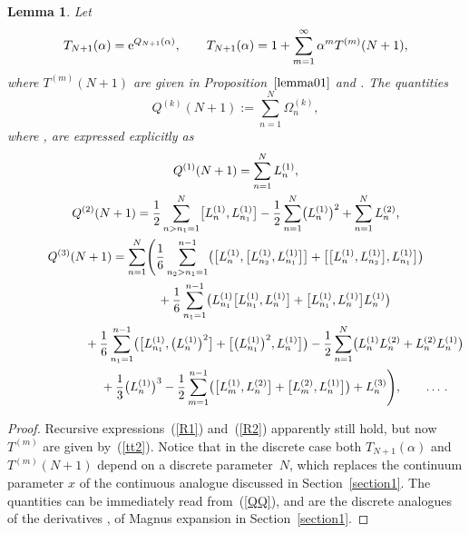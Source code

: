 \documentclass[10pt,a4paper]{amsart}
\numberwithin{equation}{section}
\newtheorem{lem}[thm]{Lemma}
\theoremstyle{definition}
\def\mathcal#1{#1}%
\begin{document}
\begin{lem}\label{lemma2} Let
\[
T_{N+1}(\alpha) = {\rm e}^{{\mathcal Q}_{N+1}(\alpha)}, \qquad T_{N+1}(\alpha)= 1+ \sum_{m=1}^{\infty}\alpha^m T^{(m)}(N+1),
\]
 where $T^{(m)}({N+1})$ are given in Proposition~$\ref{lemma01}$ and \smash{${\mathcal Q}_{N+1}(\alpha) = \sum_{m=1}^{\infty}\alpha^m {\mathcal Q}^{(m)}(N+1)$}. The quantities
\[
{\mathcal Q}^{(k)}(N+1):= \sum_{n=1}^N \Omega^{(k)}_n,\]
where \smash{$\Omega^{(k)}_n = {\mathcal Q}^{(k)}(n+1) - {\mathcal Q}^{(k)}(n)$}, are expressed explicitly as
\begin{gather}
{\mathcal Q}^{(1)}(N+1) = \sum_{n=1}^{N} L^{(1)}_{n},\nonumber\\
{\mathcal Q}^{(2)}(N+1) = \frac{1}{2}\sum_{n>n_1=1}^{N} \bigl[ L^{(1)}_{n}, L^{(1)}_{n_1} \bigr] -
\frac{1}{2}\sum_{n=1}^{N} \bigl(L^{(1)}_{n}\bigr)^2+\sum_{n=1}^NL_n^{(2)},
\nonumber\\
{\mathcal Q}^{(3)}(N+1) = \sum_{n=1}^N \Biggl(\frac{1}{6} \sum_{n_2>n_1=1}^{n-1}
\bigl(\bigl[L^{(1)}_{n}, \bigl[L^{(1)}_{n_2}, L^{(1)}_{n_1} \bigr] \bigr] +
\bigl[\bigl[L^{(1)}_{n}, L^{(1)}_{n_2} \bigr], L^{(1)}_{n_1} \bigr]\bigr) \nonumber\\
\hphantom{{\mathcal Q}^{(3)}(N+1) = }{}
 + \frac{1}{6} \sum_{n_1=1}^{n-1} \bigl( L^{(1)}_{n_1}\bigl[L^{(1)}_{n_1},
L^{(1)}_{n}\bigr] + \bigl[L^{(1)}_{n_1}, L^{(1)}_{n}\bigr] L^{(1)}_{n}\bigr) \nonumber\\
\hphantom{{\mathcal Q}^{(3)}(N+1) = }{} +
\frac{1}{6} \sum_{n_1=1}^{n-1} \bigl(\bigl[L^{(1)}_{n_1}, \bigl(L^{(1)}_{n}\bigr)^2\bigr] +
\bigl[\bigl(L^{(1)}_{n_1}\bigr)^2, L^{(1)}_{n}\bigr] \bigr)-\frac{1}{2} \sum_{n=1}^{N} \bigl(L_n^{(1)} L_n^{(2)} +
L_n^{(2)} L_n^{(1)} \bigr)\nonumber\\
\hphantom{{\mathcal Q}^{(3)}(N+1) = }{}
+ \frac{1}{3} \bigl(L^{(1)}_{n}\bigr)^3 - \frac{1}{2} \sum_{m=1}^{n-1}
\bigl( \bigl[L^{(1)}_m, L_n^{(2)} \bigr] +\bigl[L^{(2)}_m, L^{(1)}_n \bigr] \bigr) + L_n^{(3)} \Biggr), \qquad \dots\,. \label{QQ}
\end{gather}
\end{lem}
\begin{proof}
{Recursive expressions~(\ref{R1}) and~(\ref{R2}) apparently still hold, but now $T^{(m)}$ are given by~(\ref{tt2}).
Notice that in the discrete case both $T_{N+1}(\alpha)$ and $T^{(m)}(N+1)$ depend on a discrete parameter~$N$,
which replaces the continuum parameter $x$ of the continuous analogue discussed in Section~\ref{section1}. The quantities  can be immediately read from~(\ref{QQ}), and are the discrete analogues of the derivatives \smash{$\dot {\mathcal Q}^{(k)}(x)$}, of Magnus expansion in Section~\ref{section1}.}
\end{proof}
\end{document}
